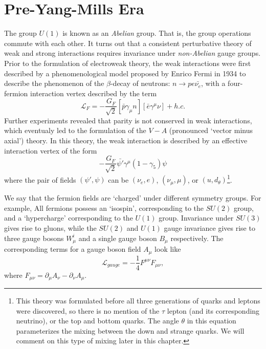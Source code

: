\section{Pre-Yang-Mills Era}

The group $U(1)$ is known as an \emph{Abelian} group. That is, the group operations commute with each other. It turns out that a consistent perturbative theory of weak and strong interactions requires invariance under \emph{non-Abelian} gauge groups. Prior to the formulation of electroweak theory, the weak interactions were first described by a phenomenological model proposed by Enrico Fermi in 1934 \citep{Fermi:1934sk,Fermi:1934hr} to describe the phenomenon of the $\beta$-decay of neutrons: $n\rightarrow p e \bar{\nu_e}$, with a four-fermion interaction vertex described by the term
\begin{equation}
\mathcal{L}_F = -\frac{G_F}{\sqrt{2}}\left[\bar{p}\gamma_\mu n\right]\left[\bar{e}\gamma^\mu\nu\right] + h.c.
\end{equation}
Further experiments \citep{Wu:1957my} revealed that parity is not conserved in weak interactions, which eventualy led to the formulation of the $V-A$ (pronounced `vector minus axial') theory. In this theory, the weak interaction is described by an effective interaction vertex of the form
\begin{equation}
-\frac{G_F}{\sqrt{2}}\bar{\psi'}\gamma^\mu(1-\gamma_5)\psi
\end{equation}
where the pair of fields $(\psi', \psi)$ can be $(\nu_e, e)$, $(\nu_\mu,\mu)$, or $(u, d_\theta)$\footnote{This theory was formulated before all three generations of quarks and leptons were discovered, so there is no mention of the $\tau$ lepton (and its corresponding neutrino), or the top and bottom quarks. The angle $\theta$ in this equation parameterizes the mixing between the down and strange quarks. We will comment on this type of mixing later in this chapter.}.



We say that the fermion fields are `charged' under different symmetry groups. For example, All fermions possess an `isospin', corresponding to the $SU(2)$ group, and a `hypercharge' corresponding to the $U(1)$ group.  
Invariance under $SU(3)$ gives rise to gluons, while the $SU(2)$ and $U(1)$ gauge invariance gives rise to three gauge bosons $W_\mu^i$ and a single gauge boson $B_\mu$ respectively. 
The corresponding terms for a gauge boson field $A_\mu$ look like
$$\mathcal{L}_{gauge} = -\frac{1}{4}F^{\mu\nu}F_{\mu\nu},$$
where $F_{\mu\nu} = \partial_\mu A_\nu - \partial_\nu A_\mu$.

